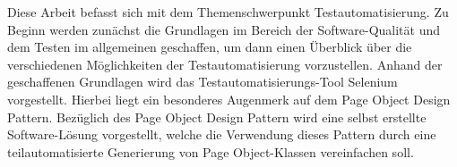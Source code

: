 \label{sec:zusammenfassung}
Diese Arbeit befasst sich mit dem Themenschwerpunkt Testautomatisierung.
Zu Beginn werden zunächst die Grundlagen im Bereich der Software-Qualität und dem Testen im allgemeinen geschaffen, um dann einen Überblick über die verschiedenen Möglichkeiten der Testautomatisierung vorzustellen.
Anhand der geschaffenen Grundlagen wird das Testautomatisierungs-Tool Selenium vorgestellt. Hierbei liegt ein besonderes Augenmerk auf dem Page Object Design Pattern. Bezüglich des Page Object Design Pattern wird eine selbst erstellte Software-Lösung vorgestellt, welche die Verwendung dieses Pattern durch eine teilautomatisierte Generierung von Page Object-Klassen vereinfachen soll.